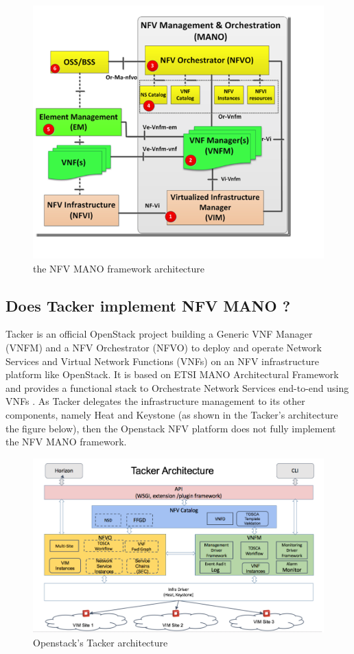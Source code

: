 \begin{figure}[htp]
    \centering
    \includegraphics[scale=0.35]{mano}
    \caption{the NFV MANO framework architecture}
\end{figure}
\subsection{Does Tacker implement NFV MANO ?}
Tacker is an official OpenStack project building a Generic VNF Manager (VNFM) and a NFV Orchestrator (NFVO) to deploy and operate Network Services and Virtual Network Functions (VNFs) on an NFV infrastructure platform like OpenStack. It is based on ETSI MANO Architectural Framework and provides a functional stack to Orchestrate Network Services end-to-end using VNFs \cite{tacker}. As Tacker delegates the infrastructure management to its other components, namely Heat and Keystone (as shown in the Tacker's architecture the figure below), then the Openstack NFV platform does not fully implement the NFV MANO framework.
\begin{figure}[htp]
    \centering
    \includegraphics[scale=0.4]{tacker}
    \caption{Openstack's Tacker architecture}
\end{figure}
\newpage

